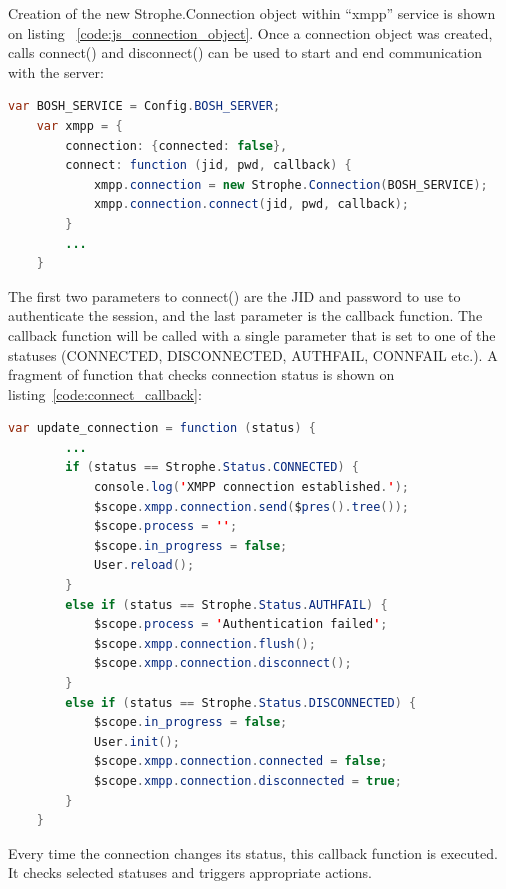 Creation of the new Strophe.Connection object within ``xmpp'' service is shown on listing ~\ref{code:js_connection_object}. Once a connection object was created, calls connect() and disconnect() can be used to start and end communication with the server:

    \begin{lstlisting}[language=java,label=code:js_connection_object,caption=Sample code of connecting/disconnectiong to XMPP BOSH]
    var BOSH_SERVICE = Config.BOSH_SERVER;
    var xmpp = {
        connection: {connected: false},
		connect: function (jid, pwd, callback) {
            xmpp.connection = new Strophe.Connection(BOSH_SERVICE);
            xmpp.connection.connect(jid, pwd, callback);
        }
        ...
    }
    \end{lstlisting}

The first two parameters to connect() are the JID and password to use to authenticate the session, and the last parameter is the callback function. The callback function will be called with a single parameter that is set to one of the statuses (CONNECTED, DISCONNECTED, AUTHFAIL, CONNFAIL etc.). A fragment of function that checks connection status is shown on listing~\ref{code:connect_callback}: 

\begin{lstlisting}[language=java,label=code:connect_callback,caption=Fragment of update-connection callback]
    var update_connection = function (status) {
        ...
        if (status == Strophe.Status.CONNECTED) {
            console.log('XMPP connection established.');
            $scope.xmpp.connection.send($pres().tree());
            $scope.process = '';
            $scope.in_progress = false;
            User.reload();
        }
        else if (status == Strophe.Status.AUTHFAIL) {
            $scope.process = 'Authentication failed';
            $scope.xmpp.connection.flush();
            $scope.xmpp.connection.disconnect();
        }
        else if (status == Strophe.Status.DISCONNECTED) {
            $scope.in_progress = false;
            User.init();
            $scope.xmpp.connection.connected = false;
            $scope.xmpp.connection.disconnected = true;
        }
    }
\end{lstlisting}

Every time the connection changes its status, this callback function is executed. It checks selected statuses and triggers appropriate actions.

